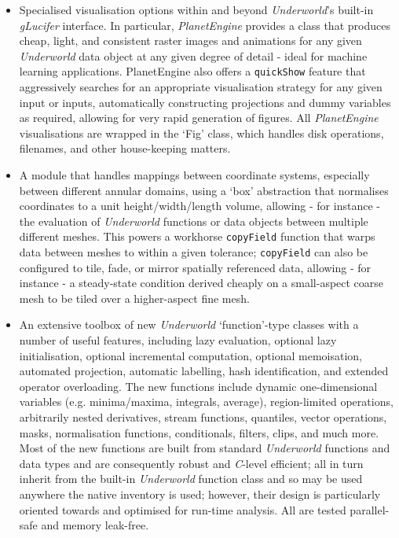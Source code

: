 \documentclass[a4paper,11pt,oneside]{book}
\begin{document}
\begin{itemize}
\item Specialised visualisation options within and beyond \textit{Underworld}'s built-in \textit{gLucifer} interface. In particular, \textit{PlanetEngine} provides a class that produces cheap, light, and consistent raster images and animations for any given \textit{Underworld} data object at any given degree of detail - ideal for machine learning applications. PlanetEngine also offers a \texttt{quickShow} feature that aggressively searches for an appropriate visualisation strategy for any given input or inputs, automatically constructing projections and dummy variables as required, allowing for very rapid generation of figures. All \textit{PlanetEngine} visualisations are wrapped in the `Fig' class, which handles disk operations, filenames, and other house-keeping matters.


\item A module that handles mappings between coordinate systems, especially between different annular domains, using a `box' abstraction that normalises coordinates to a unit height/width/length volume, allowing - for instance - the evaluation of \textit{Underworld} functions or data objects between multiple different meshes. This powers a workhorse \texttt{copyField} function that warps data between meshes to within a given tolerance; \texttt{copyField} can also be configured to tile, fade, or mirror spatially referenced data, allowing - for instance - a steady-state condition derived cheaply on a small-aspect coarse mesh to be tiled over a higher-aspect fine mesh.


\item An extensive toolbox of new \textit{Underworld} `function'-type classes with a number of useful features, including lazy evaluation, optional lazy initialisation, optional incremental computation, optional memoisation, automated projection, automatic labelling, hash identification, and extended operator overloading. The new functions include dynamic one-dimensional variables (e.g. minima/maxima, integrals, average), region-limited operations, arbitrarily nested derivatives, stream functions, quantiles, vector operations, masks, normalisation functions, conditionals, filters, clips, and much more. Most of the new functions are built from standard \textit{Underworld} functions and data types and are consequently robust and \textit{C}-level efficient; all in turn inherit from the built-in \textit{Underworld} function class and so may be used anywhere the native inventory is used; however, their design is particularly oriented towards and optimised for run-time analysis. All are tested parallel-safe and memory leak-free.



\end{itemize}
\end{document}
